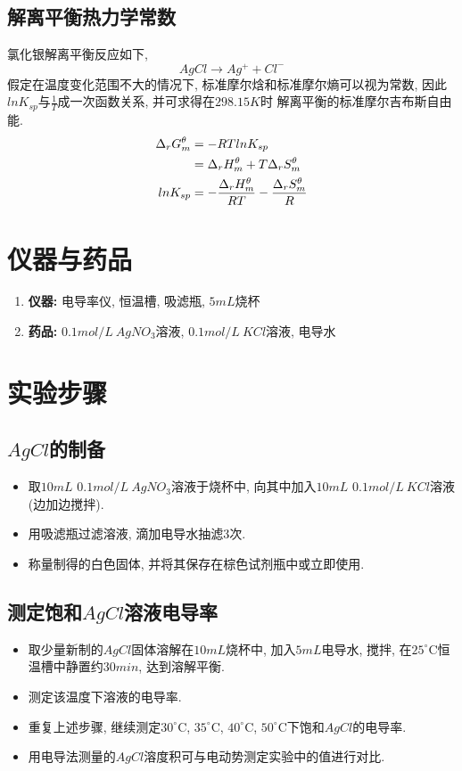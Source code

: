 \documentclass[a4paper]{article}
\begin{document}
\subsection{解离平衡热力学常数}
氯化银解离平衡反应如下, 
\begin{equation}
	AgCl \to Ag^{+} + Cl^{-}
\end{equation}
假定在温度变化范围不大的情况下, 标准摩尔焓和标准摩尔熵可以视为常数, 
因此$lnK_{sp}$与$\frac{1}{T}$成一次函数关系, 并可求得在$298.15K$时
解离平衡的标准摩尔吉布斯自由能.
\begin{equation}
	\centering
	\begin{aligned}
		\Delta_{r}G_{m}^{\theta} &= -RTlnK_{sp}\\
		&=\Delta_{r}H_{m}^{\theta} + T\Delta_{r}S_{m}^{\theta}\\
		lnK_{sp} &= -\frac{\Delta_{r}H_{m}^{\theta}}{RT} - \frac{\Delta_{r}S_{m}^{\theta}}{R}\\
	\end{aligned}
\end{equation}
\section{仪器与药品}
\begin{enumerate}
    \item \textbf{仪器:} 电导率仪, 恒温槽, 吸滤瓶, $5mL$烧杯
    \item \textbf{药品:} $0.1mol/L~AgNO_{3}$溶液, $0.1mol/L~KCl$溶液, 电导水
\end{enumerate}
\section{实验步骤}
\subsection{$AgCl$的制备}
\begin{itemize}
	\item 取$10mL$ $0.1mol/L~AgNO_{3}$溶液于烧杯中, 
	向其中加入$10mL$ $0.1mol/L~KCl$溶液(边加边搅拌).
	\item 用吸滤瓶过滤溶液, 滴加电导水抽滤3次. 
	\item 称量制得的白色固体, 并将其保存在棕色试剂瓶中或立即使用.
\end{itemize}
\subsection{测定饱和$AgCl$溶液电导率}
\begin{itemize}
	\item 取少量新制的$AgCl$固体溶解在$10mL$烧杯中, 加入$5mL$电导水, 
	搅拌, 在$25^\circ$C恒温槽中静置约$30min$, 达到溶解平衡.
	\item 测定该温度下溶液的电导率. 
	\item 重复上述步骤, 继续测定$30^\circ$C, $35^\circ$C, $40^\circ$C, 
	$50^\circ$C下饱和$AgCl$的电导率.
	\item 用电导法测量的$AgCl$溶度积可与电动势测定实验中的值进行对比.
\end{itemize}
\newpage
\end{document}
